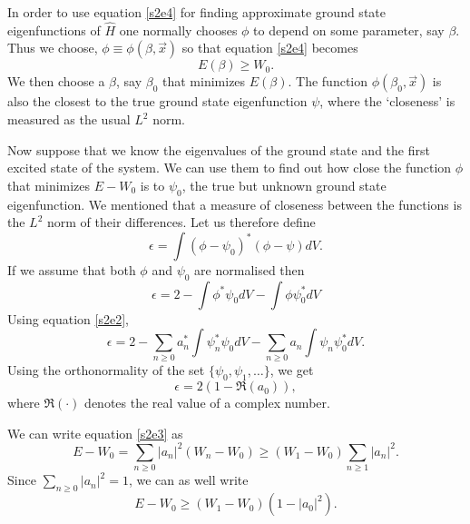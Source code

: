 \documentclass{article}
\numberwithin{equation}{section}
\begin{document}
In order to use equation \eqref{s2e4} for finding approximate ground state
eigenfunctions of $\hat{H}$ one normally chooses $\phi$ to depend on some 
parameter, say $\beta$. Thus we choose, $\phi \equiv \phi(\beta, \vec{x})$
so that equation \eqref{s2e4} becomes
\begin{equation}\label{s2e5}
E(\beta) \ge W_0.
\end{equation}
We then choose a $\beta$, say $\beta_0$ that minimizes $E(\beta)$. The 
function $\phi(\beta_0, \vec{x})$ is also the closest to the true ground 
state eigenfunction $\psi$, where the `closeness' is measured as the usual 
$L^2$ norm.

Now suppose that we know the eigenvalues of the ground state and the first 
excited state of the system. We can use them to find out how close the 
function $\phi$ that minimizes $E - W_0$ is to $\psi_0$, the true but 
unknown ground state eigenfunction. We mentioned that a measure of 
closeness between the functions is the $L^2$ norm of their differences. 
Let us therefore define
\begin{equation}\label{s2e6}
\epsilon = \int (\phi - \psi_0)^\ast(\phi - \psi)dV.
\end{equation}
If we assume that both $\phi$ and $\psi_0$ are normalised then
\[
\epsilon = 2 - \int\phi^\ast\psi_0 dV - \int\phi\psi_0^\ast dV
\]
Using equation \eqref{s2e2},
\[
\epsilon = 2 - \sum_{n \ge 0}a_n^\ast\int\psi_n^\ast\psi_0 dV - 
\sum_{n \ge 0}a_n\int\psi_n\psi_0^\ast dV.
\]
Using the orthonormality of the set $\{\psi_0, \psi_1, \ldots\}$, we get
\begin{equation}\label{s2e7}
\epsilon = 2(1 - \Re(a_0)),
\end{equation}
where $\Re(\cdot)$ denotes the real value of a complex number. 

We can write equation \eqref{s2e3} as
\[
E - W_0 = \sum_{n \ge 0}|a_n|^2(W_n - W_0) \ge (W_1 - W_0)
    \sum_{n \ge 1}|a_n|^2.
\]
Since $\sum_{n \ge 0}|a_n|^2 = 1$, we can as well write
\begin{equation}\label{s2e8}
E - W_0 \ge (W_1 - W_0)(1 - |a_0|^2).
\end{equation}
\end{document}
